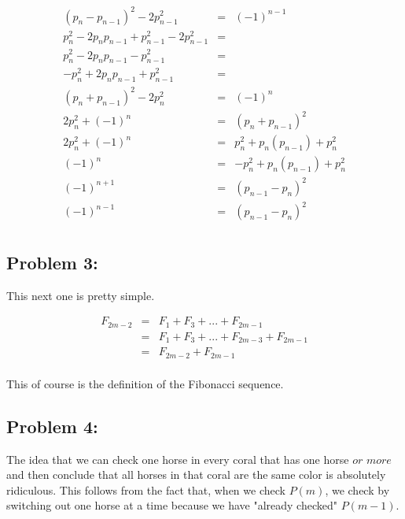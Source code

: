 \documentclass[a4paper]{article}
\begin{document}
\begin{equation}
\begin{array}{rll}
(p_n - p_{n-1})^2 - 2p^2_{n-1} & = & (-1)^{n-1} \\[.05in]
p_n^2 - 2p_n p_{n-1} + p_{n-1}^2 - 2p_{n-1}^2 & = & \\[.05in]
p_n^2 - 2p_n p_{n-1} - p_{n-1}^2 & = & \\[.05in]
-p_n^2 + 2p_n p_{n-1} + p_{n-1}^2 & = & \\[.05in]
(p_n + p_{n-1})^2 - 2p_n^2 & = & (-1)^{n} \\[.05in]
2p_n^2 + (-1)^n & = & (p_n + p_{n-1})^2 \\[.05in]
2p_n^2 + (-1)^n & = & p_n^2 + p_n(p_{n-1}) + p_n^2 \\[.05in]
(-1)^n & = & -p_n^2 + p_n(p_{n-1}) + p_n^2 \\[.05in]
(-1)^{n+1} & = & (p_{n-1} - p_n)^2 \\[.05in]
(-1)^{n-1} & = & (p_{n-1} - p_n)^2 \\[.05in]
\end{array}
\end{equation}	

\subsection*{Problem 3:}

This next one is pretty simple.

\begin{equation}
\begin{array}{rll}
F_{2m-2} & = & F_1 + F_3 + ... + F_{2m-1} \\[.1in]
& = & F_1 + F_3 + ... + F_{2m-3} + F_{2m-1} \\[.1in]
& = & F_{2m-2} + F_{2m-1} \\[.1in]
\end{array}
\end{equation}	

This of course is the definition of the Fibonacci sequence.

\subsection*{Problem 4:}

The idea that we can check one horse in every coral that has one horse $\textit{or more}$ and then conclude that all horses in that coral are the same color is absolutely ridiculous. This follows from the fact that, when we check $P(m)$, we check by switching out one horse at a time because we have "already checked" $P(m-1)$.
\end{document}
